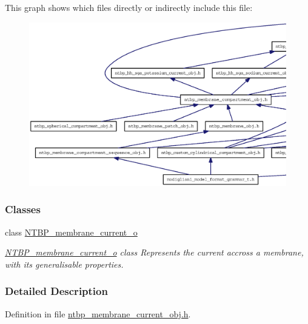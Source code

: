 This graph shows which files directly or indirectly include this file:
\nopagebreak
\begin{figure}[H]
\begin{center}
\leavevmode
\includegraphics[width=400pt]{ntbp__membrane__current__obj_8h__dep__incl}
\end{center}
\end{figure}
\subsubsection*{Classes}
\begin{DoxyCompactItemize}
\item 
class \hyperlink{class_n_t_b_p__membrane__current__o}{NTBP\_\-membrane\_\-current\_\-o}
\begin{DoxyCompactList}\small\item\em \hyperlink{class_n_t_b_p__membrane__current__o}{NTBP\_\-membrane\_\-current\_\-o} class Represents the current accross a membrane, with its generalisable properties. \item\end{DoxyCompactList}\end{DoxyCompactItemize}


\subsubsection{Detailed Description}


Definition in file \hyperlink{ntbp__membrane__current__obj_8h_source}{ntbp\_\-membrane\_\-current\_\-obj.h}.

